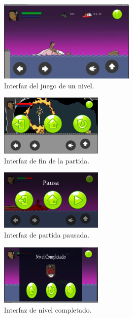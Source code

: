 \begin{figure}[H]
    \centering
    \includegraphics[width=0.6\textwidth]{Anexos/Interfaces/InterfazJuego01.png}
    \caption{Interfaz del juego de un nivel.}
    \label{fig:Game01}
\end{figure}

\begin{figure}[H]
    \centering
    \includegraphics[width=0.45\textwidth]{Anexos/Interfaces/finJuego.png}
    \caption{Interfaz de fin de la partida.}
    \label{fig:Game02}
\end{figure}

\begin{figure}[H]
    \centering
    \includegraphics[width=0.45\textwidth]{Anexos/Interfaces/menuPausa.png}
    \caption{Interfaz de partida pausada.}
    \label{fig:Game02}
\end{figure}

\begin{figure}[H]
    \centering
    \includegraphics[width=0.45\textwidth]{Anexos/Interfaces/InterfazJuego08.png}
    \caption{Interfaz de nivel completado.}
    \label{fig:Game02}
\end{figure}